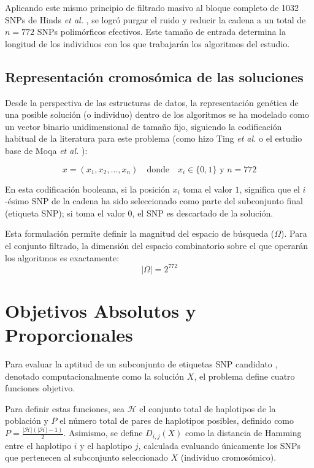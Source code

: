 Aplicando este mismo principio de filtrado masivo al bloque completo de 1032 SNPs de Hinds \textit{et al.} \cite{hinds2005whole}, se logró purgar el ruido y reducir la cadena a un total de $n = 772$ SNPs polimórficos efectivos. Este tamaño de entrada determina la longitud de los individuos con los que trabajarán los algoritmos del estudio.

\subsection{Representación cromosómica de las soluciones}
Desde la perspectiva de las estructuras de datos, la representación genética de una posible solución (o individuo) dentro de los algoritmos se ha modelado como un vector binario unidimensional de tamaño fijo, siguiendo la codificación habitual de la literatura para este problema (como hizo Ting \textit{et al.} \cite{ting2010multi} o el estudio base de Moqa \textit{et al.} \cite{moqa2022assessing}):

\[ 
x = (x_1, x_2, \dots, x_n) \quad \text{donde} \quad x_i \in \{0, 1\} \text{ y } n = 772 
\]

En esta codificación booleana, si la posición $x_i$ toma el valor $1$, significa que el $i$-ésimo SNP de la cadena ha sido seleccionado como parte del subconjunto final (etiqueta SNP); si toma el valor $0$, el SNP es descartado de la solución.

Esta formulación permite definir la magnitud del espacio de búsqueda ($\Omega$). Para el conjunto filtrado, la dimensión del espacio combinatorio sobre el que operarán los algoritmos es exactamente:
\[ 
|\Omega| = 2^{772} 
\]

\section{Objetivos Absolutos y Proporcionales}

Para evaluar la aptitud de un subconjunto de etiquetas SNP candidato \cite{ting2010multi}, denotado computacionalmente como la solución $X$, el problema define cuatro funciones objetivo.

Para definir estas funciones, sea $\mathcal{H}$ el conjunto total de haplotipos de la población y $P$ el número total de pares de haplotipos posibles, definido como $P = \frac{|\mathcal{H}|(|\mathcal{H}|-1)}{2}$. Asimismo, se define $D_{i,j}(X)$ como la distancia de Hamming entre el haplotipo $i$ y el haplotipo $j$, calculada evaluando únicamente los SNPs que pertenecen al subconjunto seleccionado $X$ (individuo cromosómico).

